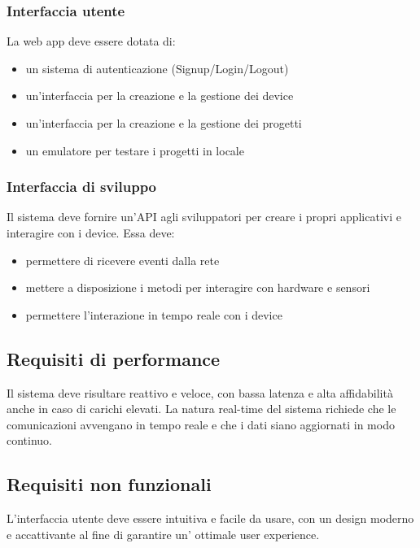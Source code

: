 \subsubsection{Interfaccia utente}

La web app deve essere dotata di: 
\begin{itemize}
    \item un sistema di autenticazione (Signup/Login/Logout)
    \item un'interfaccia per la creazione e la gestione dei device
    \item un'interfaccia per la creazione e la gestione dei progetti
    \item un emulatore per testare i progetti in locale
\end{itemize}

\subsubsection{Interfaccia di sviluppo}

Il sistema deve fornire un'API agli sviluppatori per creare i propri applicativi e interagire con i device.
Essa deve:
\begin{itemize}
    \item permettere di ricevere eventi dalla rete
    \item mettere a disposizione i metodi per interagire con hardware e sensori
    \item permettere l'interazione in tempo reale con i device
\end{itemize}

\subsection{Requisiti di performance}

Il sistema deve risultare reattivo e veloce, con bassa latenza e alta affidabilità anche in caso di carichi elevati.
La natura real-time del sistema richiede che le comunicazioni avvengano in tempo reale e che i dati siano aggiornati
in modo continuo.

\subsection{Requisiti non funzionali}

L'interfaccia utente deve essere intuitiva e facile da usare, con un design moderno e accattivante al fine di garantire 
un' ottimale user experience.


